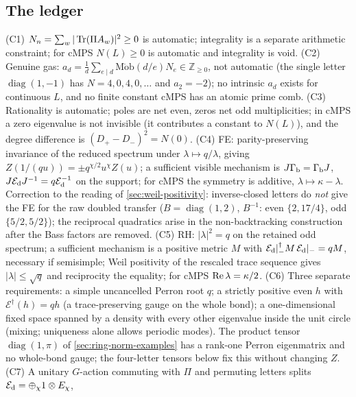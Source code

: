 \subsection{The ledger}

\begin{observation}
\label{obs:zeta-condition-ledger}
(C1) $N_n = \sum_w|\operatorname{Tr}(\Pi A_{w})|^2\ge0$ is automatic; integrality is a separate arithmetic constraint;
for cMPS $N(L)\ge0$ is automatic and integrality is void. (C2) Genuine gas: $a_d = \frac1d\sum_{e\mid d}
\operatorname{M\ddot ob}(d/e)N_e\in\mathbb Z_{\ge0}$, not automatic (the single letter $\operatorname{diag}(1,-1)$
has $N = 4,0,4,0,\dots$ and $a_2 = -2$); no intrinsic $a_d$ exists for continuous $L$, and no
finite constant cMPS has an atomic prime comb. (C3) Rationality is automatic; poles are net even,
zeros net odd multiplicities; in cMPS a zero eigenvalue is not invisible (it contributes a constant
to $N(L)$), and the degree difference is $(D_+-D_-)^2 = N(0)$. (C4) FE: parity-preserving
invariance of the reduced spectrum under $\lambda\mapsto q/\lambda$, giving $Z(1/(qu)) =
\pm q^{\chi/2}u^{\chi}Z(u)$; a sufficient visible mechanism is $J\Gamma_{\mathrm b} = \Gamma_{\mathrm b} J$, $J\mathcal E_{\mathrm d} J^{-1} =
q\mathcal E_{\mathrm d}^{-1}$ on the support; for cMPS the symmetry is additive, $\lambda\mapsto\kappa-\lambda$.
Correction to the reading of \cref{sec:weil-positivity}: inverse-closed letters do \emph{not}
give the FE for the raw doubled transfer ($B = \operatorname{diag}(1,2)$, $B^{-1}$: even $\{2,17/4\}$,
odd $\{5/2,5/2\}$); the reciprocal quadratics arise in the non-backtracking construction after the
Bass factors are removed. (C5) RH: $|\lambda|^2 = q$ on the retained odd spectrum; a sufficient
mechanism is a positive metric $M$ with $\mathcal E_{\mathrm d}|_-^\dagger M\,\mathcal E_{\mathrm d}|_- = qM$, necessary if semisimple;
Weil positivity of the rescaled trace sequence gives $|\lambda|\le\sqrt q$ and reciprocity the
equality; for cMPS $\operatorname{Re}\lambda = \kappa/2$. (C6) Three separate requirements: a simple uncancelled
Perron root $q$; a strictly positive even $h$ with $\mathcal E^\dagger(h) = qh$ (a trace-preserving
gauge on the whole bond); a one-dimensional fixed space spanned by a density with every other
eigenvalue inside the unit circle (mixing; uniqueness alone allows periodic modes). The product
tensor $\operatorname{diag}(1,\pi)$ of \cref{sec:ring-norm-examples} has a rank-one Perron eigenmatrix
and no whole-bond gauge; the four-letter tensors below fix this without changing $Z$. (C7) A unitary
$G$-action commuting with $\Pi$ and permuting letters splits $\mathcal E_{\mathrm d} = \oplus_\chi1\otimes E_\chi$,

\end{observation}
